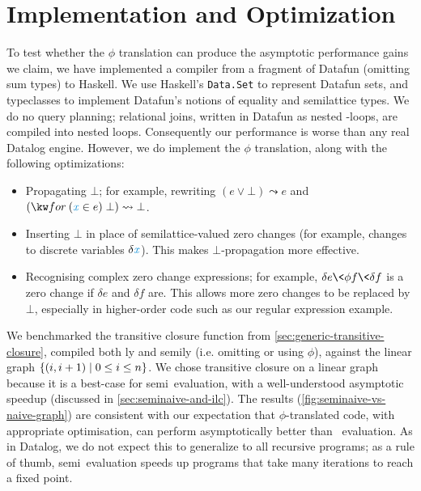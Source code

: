 \section{Implementation and Optimization}
\label{sec:implementation}

\newcommand\rewrites\leadsto

To test whether the $\phi$ translation can produce the asymptotic performance
gains we claim, we have implemented a compiler from a fragment of Datafun
(omitting sum types) to Haskell.
%
We use Haskell's \texttt{Data.Set} to represent Datafun sets, and
typeclasses to implement Datafun's notions of equality and semilattice types.
%
We do no query planning; relational joins, written in Datafun as nested
-loops, are compiled into nested loops.
%
Consequently our performance is worse than any real Datalog engine.
%
However, we do implement the $\phi$ translation, along with the following
optimizations:

\begin{itemize}
\item Propagating $\bot$; for example, rewriting $(e \vee \bot) \rewrites e$ and
  $(\efor{x}{e} \bot) \rewrites \bot$.

\item Inserting $\bot$ in place of semilattice-valued zero changes (for example,
  changes to discrete variables $\delta \dvar x$). This makes $\bot$-propagation
  more effective.

\item Recognising complex zero change expressions; for example, $\delta e \<\phi
  f \<\delta f$ is a zero change if $\delta e$ and $\delta f$ are. This allows
  more zero changes to be replaced by $\bot$, especially in higher-order code
  such as our regular expression example.
\end{itemize}



We benchmarked the transitive closure function  from
\cref{sec:generic-transitive-closure}, compiled both \naive{}ly and
semi\naive{}ly (i.e. omitting or using $\phi$), against the linear graph
$\{(i,i+1) \mathrel{|} 0 \le i \le n\}$. We chose transitive closure on a linear graph
because it is a best-case for semi\naive\ evaluation, with a well-understood
asymptotic speedup (discussed in \cref{sec:seminaive-and-ilc}). The results
(\cref{fig:seminaive-vs-naive-graph}) are consistent with our expectation that
$\phi$-translated code, with appropriate optimisation, can perform
asymptotically better than \naive\ evaluation. As in Datalog, we do not expect
this to generalize to all recursive programs; as a rule of thumb,
semi\naive\ evaluation speeds up programs that take many iterations
to reach a fixed point.
%
%

